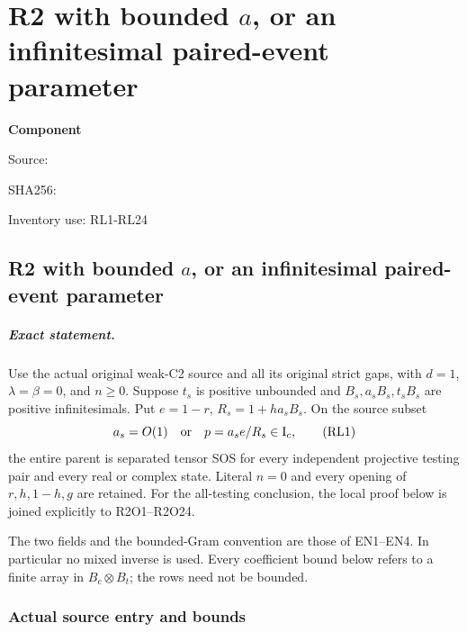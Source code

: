 \chapter{R2 with bounded \(a\), or an infinitesimal paired-event parameter}
\label{component:p393d3faa269a}
\noindent\textbf{Component }\par
{\small\noindent Source: \par}
{\small\noindent SHA256: \par}
{\small\noindent Inventory use: RL1-RL24\par}
\medskip
\section{R2 with bounded \(a\), or an infinitesimal paired-event parameter}
\label{p393d3faa269a:sec:r2-shifted-local}

\paragraph{Exact statement.}
Use the actual original weak-C2 source and all its original strict
gaps, with \(d=1\), \(\lambda=\beta=0\), and \(n\geq0\).
Suppose \(t_s\) is positive unbounded and
\(B_s,a_sB_s,t_sB_s\) are positive infinitesimals.
Put \(e=1-r\), \(R_s=1+ha_sB_s\).  On the source subset
\[
       a_s=O(1)\quad\hbox{or}\quad
       p=a_s e/R_s\in\mathrm I_c,                     \tag{RL1}
\]
the entire parent is separated tensor SOS for every independent
projective testing pair and every real or complex state.
Literal \(n=0\) and every opening of \(r,h,1-h,g\) are retained.
For the all-testing conclusion, the local proof below is joined
explicitly to R2O1--R2O24.

The two fields and the bounded-Gram convention are those of EN1--EN4.
In particular no mixed inverse is used.  Every coefficient bound
below refers to a finite array in \(B_c\otimes B_t\); the rows need
not be bounded.

\subsection{Actual source entry and bounds}

